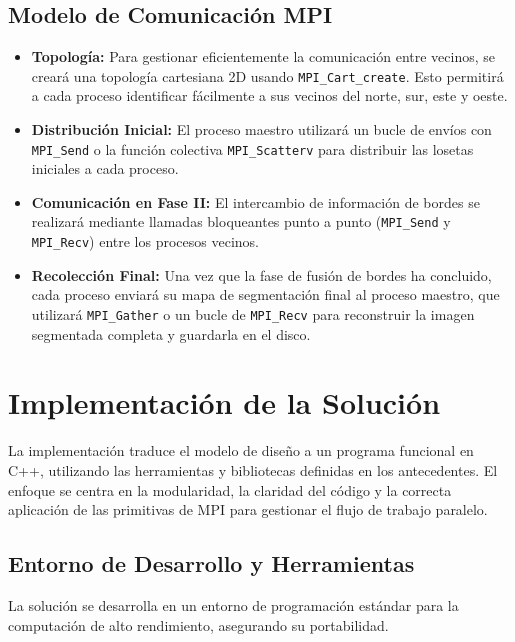 \documentclass[fleqn,10pt]{article}
\begin{document}
\subsection{Modelo de Comunicación MPI}
\begin{itemize}
    \item \textbf{Topología:} Para gestionar eficientemente la comunicación entre vecinos, se creará una topología cartesiana 2D usando \texttt{MPI\_Cart\_create}. Esto permitirá a cada proceso identificar fácilmente a sus vecinos del norte, sur, este y oeste.
    \item \textbf{Distribución Inicial:} El proceso maestro utilizará un bucle de envíos con \texttt{MPI\_Send} o la función colectiva \texttt{MPI\_Scatterv} para distribuir las losetas iniciales a cada proceso.
    \item \textbf{Comunicación en Fase II:} El intercambio de información de bordes se realizará mediante llamadas bloqueantes punto a punto (\texttt{MPI\_Send} y \texttt{MPI\_Recv}) entre los procesos vecinos.
    \item \textbf{Recolección Final:} Una vez que la fase de fusión de bordes ha concluido, cada proceso enviará su mapa de segmentación final al proceso maestro, que utilizará \texttt{MPI\_Gather} o un bucle de \texttt{MPI\_Recv} para reconstruir la imagen segmentada completa y guardarla en el disco.
\end{itemize}

\section{Implementación de la Solución}
La implementación traduce el modelo de diseño a un programa funcional en C++, utilizando las herramientas y bibliotecas definidas en los antecedentes. El enfoque se centra en la modularidad, la claridad del código y la correcta aplicación de las primitivas de MPI para gestionar el flujo de trabajo paralelo.

\subsection{Entorno de Desarrollo y Herramientas}
La solución se desarrolla en un entorno de programación estándar para la computación de alto rendimiento, asegurando su portabilidad.
\end{document}

